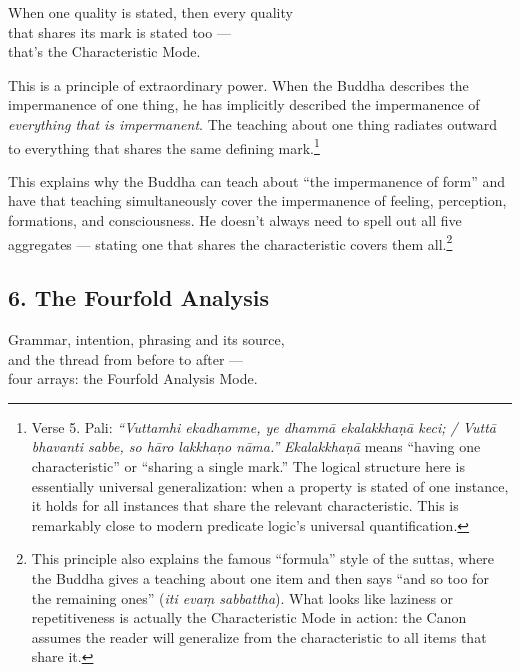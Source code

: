 \begin{versebox}
When one quality is stated, then every quality\\
that shares its mark is stated too ---\\
that's the Characteristic Mode.
\end{versebox}

This is a principle of extraordinary power. When the Buddha describes the impermanence of one thing, he has implicitly described the impermanence of \textit{everything that is impermanent}. The teaching about one thing radiates outward to everything that shares the same defining mark.\footnote{Verse 5. Pali: \textit{``Vuttamhi ekadhamme, ye dhammā ekalakkhaṇā keci; / Vuttā bhavanti sabbe, so hāro lakkhaṇo nāma.''} \textit{Ekalakkhaṇā} means ``having one characteristic'' or ``sharing a single mark.'' The logical structure here is essentially universal generalization: when a property is stated of one instance, it holds for all instances that share the relevant characteristic. This is remarkably close to modern predicate logic's universal quantification.}

This explains why the Buddha can teach about ``the impermanence of form'' and have that teaching simultaneously cover the impermanence of feeling, perception, formations, and consciousness. He doesn't always need to spell out all five aggregates --- stating one that shares the characteristic covers them all.\footnote{This principle also explains the famous ``formula'' style of the suttas, where the Buddha gives a teaching about one item and then says ``and so too for the remaining ones'' (\textit{iti evaṃ sabbattha}). What looks like laziness or repetitiveness is actually the Characteristic Mode in action: the Canon assumes the reader will generalize from the characteristic to all items that share it.}

\subsection*{6. The Fourfold Analysis}

\begin{versebox}
Grammar, intention, phrasing and its source,\\
and the thread from before to after ---\\
four arrays: the Fourfold Analysis Mode.
\end{versebox}

